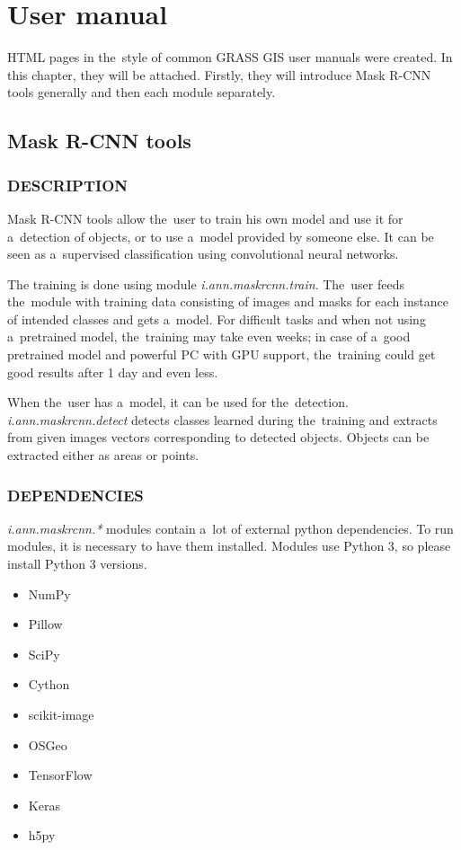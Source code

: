 \chapter{User manual}
\label{manual}

HTML pages in the~style of common GRASS GIS user manuals were created. In this
chapter, they will be attached. Firstly, they will introduce Mask R-CNN tools
generally and then each module separately.

\section{Mask R-CNN tools}
\label{appendix-lib}

\subsection*{DESCRIPTION}

Mask R-CNN tools allow the~user to train his own model and use it for
a~detection of objects, or to use a~model provided by someone else. It can be
seen as a~supervised classification using convolutional neural networks.

The training is done using module \emph{i.ann.maskrcnn.train}. The~user feeds
the~module with training data consisting of images and masks for each instance
of intended classes and gets a~model. For difficult tasks and when not using
a~pretrained model, the~training may take even weeks; in case of a~good
pretrained model and powerful PC with GPU support, the~training could get good
results after 1 day and even less.

When the~user has a~model, it can be used for the~detection. 
\emph{i.ann.maskrcnn.detect} detects classes learned during the~training and 
extracts from given images vectors corresponding to detected objects. Objects 
can be extracted either as areas or points. 

\subsection*{DEPENDENCIES}

\emph{i.ann.maskrcnn.*} modules contain a~lot of external python dependencies.
To run modules, it is necessary to have them installed. Modules use Python 3,
so please install Python 3 versions.

\liststyleLi
\begin{itemize}
\item NumPy
\item Pillow
\item SciPy
\item Cython
\item scikit-image
\item OSGeo
\item TensorFlow
\item Keras
\item h5py
\end{itemize}

